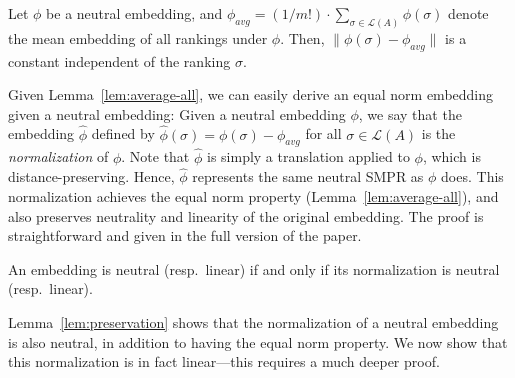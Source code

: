 \documentclass[prodmode]{acmsmall-ec14}
\newcommand{\calL}{{\mathcal{L}}}
\newcommand{\rank}{{\calL(A)}}
\begin{document}
\begin{lemma}
Let $\phi$ be a neutral embedding, and $\phi_{avg} = (1/m!) \cdot \sum_{\sigma \in \rank} \phi(\sigma)$ denote the mean embedding of all rankings under $\phi$. Then, $\|\phi(\sigma)-\phi_{avg}\|$ is a constant independent of the ranking $\sigma$.
\label{lem:average-all}
\end{lemma}
%
Given Lemma~\ref{lem:average-all}, we can easily derive an equal norm embedding given a neutral embedding: Given a neutral embedding $\phi$, we say that the embedding $\hat{\phi}$ defined by $\hat{\phi}(\sigma) = \phi(\sigma) - \phi_{avg}$ for all $\sigma \in \rank$ is the \emph{normalization} of $\phi$. Note that $\hat{\phi}$ is simply a translation applied to $\phi$, which is distance-preserving. Hence, $\hat{\phi}$ represents the same neutral SMPR as $\phi$ does. This normalization achieves the equal norm property (Lemma~\ref{lem:average-all}), and also preserves neutrality and linearity of the original embedding. The proof is straightforward and given in the full version of the paper. %


\begin{lemma}
An embedding is neutral (resp.\ linear) if and only if its normalization is neutral (resp.\ linear). 
\label{lem:preservation}
\end{lemma}
%
Lemma~\ref{lem:preservation} shows that the normalization of a neutral embedding is also neutral, in addition to having the equal norm property. We now show that this normalization is in fact linear---this requires a much deeper proof. 
\end{document}
